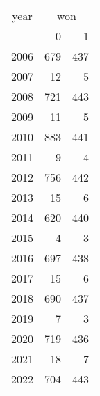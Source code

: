 \footnotesize\begin{tabular}[t]{lrr}
\toprule
\multicolumn{1}{c}{year} & \multicolumn{2}{c}{won} \\
\cmidrule(l{3pt}r{3pt}){1-1} \cmidrule(l{3pt}r{3pt}){2-3}
  & 0 & 1\\
\midrule
2006 & 679 & 437\\
2007 & 12 & 5\\
2008 & 721 & 443\\
2009 & 11 & 5\\
2010 & 883 & 441\\
2011 & 9 & 4\\
2012 & 756 & 442\\
2013 & 15 & 6\\
2014 & 620 & 440\\
2015 & 4 & 3\\
2016 & 697 & 438\\
2017 & 15 & 6\\
2018 & 690 & 437\\
2019 & 7 & 3\\
2020 & 719 & 436\\
2021 & 18 & 7\\
2022 & 704 & 443\\
\bottomrule
\end{tabular}
